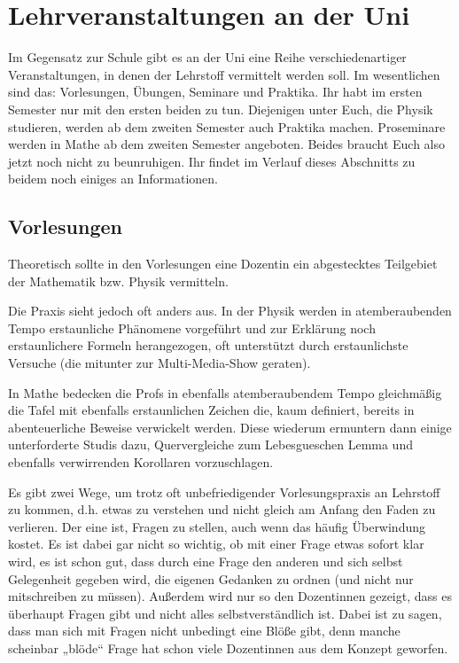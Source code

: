 \section{Lehrveranstaltungen an der Uni}

Im Gegensatz zur Schule gibt es an der Uni eine Reihe verschiedenartiger Veranstaltungen, in denen der Lehrstoff vermittelt werden soll. Im wesentlichen sind das: Vorlesungen, Übungen, Seminare und Praktika. Ihr habt im ersten Semester nur mit den ersten beiden zu tun. Diejenigen unter Euch, die Physik studieren, werden ab dem zweiten Semester auch Praktika machen. Proseminare werden in Mathe ab dem zweiten Semester angeboten. Beides braucht Euch also jetzt noch nicht zu beunruhigen. Ihr findet im Verlauf dieses Abschnitts zu beidem noch einiges an Informationen.

\subsection{Vorlesungen}

Theoretisch sollte in den Vorlesungen eine Dozentin ein abgestecktes Teilgebiet der Mathematik bzw. Physik vermitteln.

Die Praxis sieht jedoch oft anders aus. In der Physik werden in atemberaubenden Tempo erstaunliche Phänomene vorgeführt und zur Erklärung noch erstaunlichere Formeln herangezogen, oft unterstützt durch erstaunlichste Versuche (die mitunter zur Multi-Media-Show geraten).

In Mathe bedecken die Profs in ebenfalls atemberaubendem Tempo gleichmäßig die Tafel mit ebenfalls erstaunlichen Zeichen die, kaum definiert, bereits in abenteuerliche Beweise verwickelt werden. Diese wiederum ermuntern dann einige unterforderte Studis dazu, Quervergleiche zum Lebesgueschen Lemma und ebenfalls verwirrenden Korollaren vorzuschlagen.

Es gibt zwei Wege, um trotz oft unbefriedigender Vorlesungspraxis an Lehrstoff zu kommen, d.h. etwas zu verstehen und nicht gleich am Anfang den Faden zu verlieren. Der eine ist, Fragen zu stellen, auch wenn das häufig Überwindung kostet. Es ist dabei gar nicht so wichtig, ob mit einer Frage etwas sofort klar wird, es ist schon gut, dass durch eine Frage den anderen und sich selbst Gelegenheit gegeben wird, die eigenen Gedanken zu ordnen (und nicht nur mitschreiben zu müssen). Außerdem wird nur so den Dozentinnen gezeigt, dass es überhaupt Fragen gibt und nicht alles selbstverständlich ist. Dabei ist zu sagen, dass man sich mit Fragen nicht unbedingt eine Blöße gibt, denn manche scheinbar „blöde“ Frage hat schon viele Dozentinnen aus dem Konzept geworfen.

